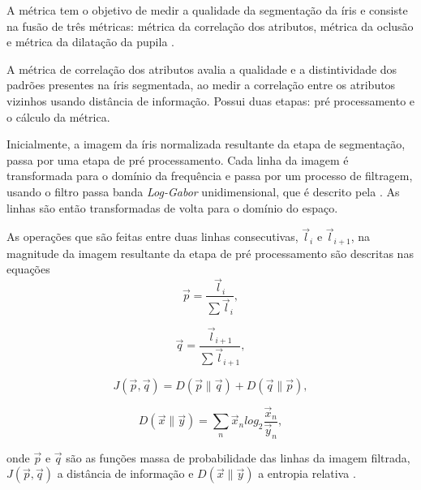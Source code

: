 \par A métrica tem o objetivo de medir a qualidade da segmentação da íris e consiste na fusão de três métricas: métrica da correlação dos atributos, métrica da oclusão e métrica da dilatação da pupila \cite{du2010}.

\par A métrica de correlação dos atributos avalia a qualidade e a distintividade dos padrões presentes na íris segmentada, ao medir a correlação entre os atributos vizinhos usando distância de informação. Possui duas etapas: pré processamento e o cálculo da métrica.

\par Inicialmente, a imagem da íris normalizada resultante da etapa de segmentação, passa por uma etapa de pré processamento. Cada linha da imagem é transformada para o domínio da frequência e passa por um processo de filtragem, usando o filtro passa banda \textit{Log-Gabor} unidimensional, que é descrito pela . As linhas são então transformadas de volta para o domínio do espaço.



\par As operações que são feitas entre duas linhas consecutivas, $\vec{l}_{i}$ e $\vec{l}_{i+1}$, na magnitude da imagem resultante da etapa de pré processamento são descritas nas equações
\begin{equation} \label{eq:fce:fcm1}
    \vec{p} = \frac{\vec{l}_{i}}{\sum\vec{l}_{i}},
\end{equation}

\begin{equation} \label{eq:fce:fcm2}
    \vec{q} = \frac{\vec{l}_{i+1}}{\sum\vec{l}_{i+1}},
\end{equation}

\begin{equation} \label{eq:fce:fcm3}
    J(\vec{p},\vec{q}) = D(\vec{p}\parallel\vec{q}) + D(\vec{q}\parallel\vec{p}),
\end{equation}

\begin{equation} \label{eq:fce:fcm4}
    D(\vec{x}\parallel\vec{y}) = \sum_{n}\vec{x}_{n}log_{2}\frac{\vec{x}_{n}}{\vec{y}_{n}},
\end{equation}

\noindent onde $\vec{p}$ e $\vec{q}$ são as funções massa de probabilidade das linhas da imagem filtrada, $J(\vec{p},\vec{q})$ a distância de informação e $D(\vec{x}\parallel\vec{y})$ a entropia relativa \cite{Mackay2002-RelativeEntropy}.

